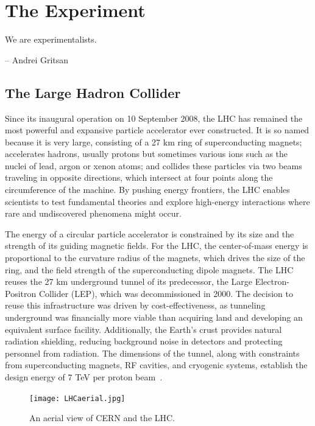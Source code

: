\chapter{The Experiment} \label{chap:chap-3}


\epigraph{We are experimentalists.}{-- Andrei Gritsan}





\section{The Large Hadron Collider}

Since its inaugural operation on 10 September 2008, the LHC has remained the most powerful and expansive particle accelerator ever constructed. It is so named because it is very large, consisting of a 27 km ring of superconducting magnets; accelerates hadrons, usually protons but sometimes various ions such as the nuclei of lead, argon or xenon atoms; and collides these particles via two beams traveling in opposite directions, which intersect at four points along the circumference of the machine. By pushing energy frontiers, the LHC enables scientists to test fundamental theories and explore high-energy interactions where rare and undiscovered phenomena might occur.

The energy of a circular particle accelerator is constrained by its size and the strength of its guiding magnetic fields. For the LHC, the center-of-mass energy is proportional to the curvature radius of the magnets, which drives the size of the ring, and the field strength of the superconducting dipole magnets. The LHC reuses the 27 km underground tunnel of its predecessor, the Large Electron-Positron Collider (LEP), which was decommissioned in 2000. The decision to reuse this infrastructure was driven by cost-effectiveness, as tunneling underground was financially more viable than acquiring land and developing an equivalent surface facility.  Additionally, the Earth's crust provides natural radiation shielding, reducing background noise in detectors and protecting personnel from radiation. The dimensions of the tunnel, along with constraints from superconducting magnets, RF cavities, and cryogenic systems, establish the design energy of 7 TeV per proton beam~\cite{CERNBroc79}.

\begin{figure}[!ht]
    \begin{center}
        \texttt{[image: LHCaerial.jpg]}
        \caption{An aerial view of CERN and the LHC.}
        \label{fig:LHCaerial}
    \end{center}
\end{figure}

